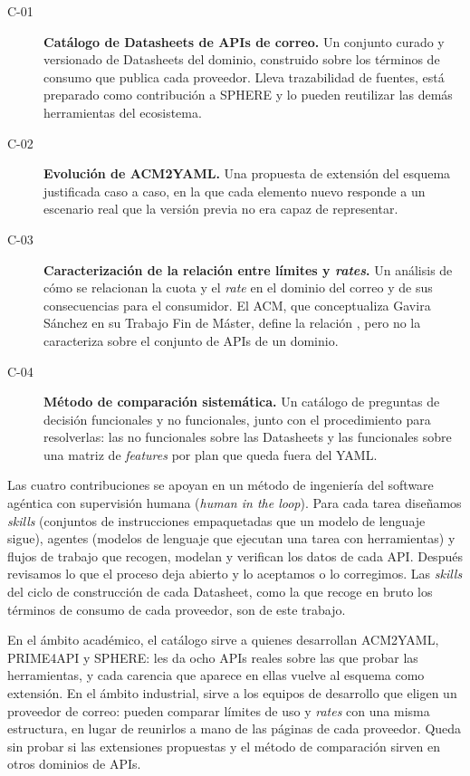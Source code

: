 \begin{description}
  \item[C-01] \textbf{Catálogo de Datasheets de APIs de correo.} Un
    conjunto curado y versionado de Datasheets del dominio, construido sobre
    los términos de consumo que publica cada proveedor. Lleva trazabilidad
    de fuentes, está preparado como contribución a SPHERE y lo pueden
    reutilizar las demás herramientas del ecosistema.
  \item[C-02] \textbf{Evolución de ACM2YAML.} Una propuesta de extensión del
    esquema justificada caso a caso, en la que cada elemento nuevo responde
    a un escenario real que la versión previa no era capaz de representar.
  \item[C-03] \textbf{Caracterización de la relación entre límites y
    \textit{rates}.} Un análisis de cómo se relacionan la cuota y el \textit{rate} en el
    dominio del correo y de sus consecuencias para el consumidor. El ACM,
    que conceptualiza Gavira Sánchez en su Trabajo Fin de Máster, define
    la relación \citep{gavira2026tfm}, pero no la caracteriza sobre el
    conjunto de APIs de un dominio.
  \item[C-04] \textbf{Método de comparación sistemática.} Un catálogo de
    preguntas de decisión funcionales y no funcionales, junto con el
    procedimiento para resolverlas: las no funcionales sobre las
    Datasheets y las funcionales sobre una matriz de \textit{features} por
    plan que queda fuera del YAML.
\end{description}

Las cuatro contribuciones se apoyan en un método de ingeniería del software
agéntica con supervisión humana (\textit{human in the loop}). Para cada tarea
diseñamos \textit{skills} (conjuntos de instrucciones empaquetadas que un
modelo de lenguaje sigue), agentes (modelos de lenguaje que ejecutan una
tarea con herramientas) y flujos de trabajo que recogen, modelan y
verifican los datos de cada API. Después revisamos lo que el proceso deja abierto
y lo aceptamos o lo corregimos. Las \textit{skills} del ciclo de construcción de cada Datasheet, como la que recoge en bruto los términos de consumo de cada proveedor, son de este trabajo.

En el ámbito académico, el catálogo sirve a quienes desarrollan ACM2YAML, PRIME4API y SPHERE: les da ocho APIs reales sobre las que probar las herramientas, y cada carencia que aparece en ellas vuelve al esquema como extensión. En el ámbito industrial, sirve a los equipos de desarrollo que eligen un proveedor de correo: pueden comparar límites de uso y \textit{rates} con una misma estructura, en lugar de reunirlos a mano de las páginas de cada proveedor. Queda sin probar si las extensiones propuestas y el método de comparación sirven en otros dominios de APIs.

